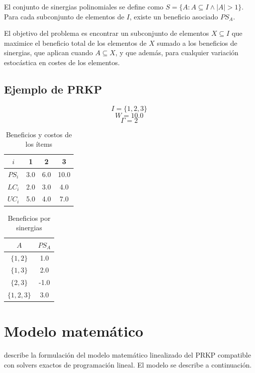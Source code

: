 \documentclass[spanish, a4paper, 12pt, openany,final]{book}
\begin{document}
	El conjunto de sinergias polinomiales se define como $S = \{ A: A \subseteq I \land |A|>1  \}$. Para cada subconjunto de elementos de $I$, existe un beneficio asociado $PS_A$.
	
	El objetivo del problema es encontrar un subconjunto de elementos $X \subseteq I$ que maximice el beneficio total de los elementos de $X$ sumado a los beneficios de sinergias, que aplican cuando $A\subseteq X$, y que además, para cualquier variación estocástica en costes de los elementos.
	
	\subsection*{Ejemplo de PRKP}
		$$I =\{1,2,3\}$$
		$$W = 10.0$$
		$$\Gamma = 2$$

	\begin{table}[H]
		\centering
	\begin{tabular}{|c|c|c|c|}
		\hline
		$i$ & 1 & 2 & 3 \\
		\hline
		$PS_i$ & 3.0 & 6.0 & 10.0 \\
		\hline
		$LC_i$ & 2.0 & 3.0 & 4.0 \\
		\hline
		$UC_i$ & 5.0 & 4.0 & 7.0 \\
		\hline
	\end{tabular}
	\caption{Beneficios y costos de los ítems}
	\end{table}
	
	\begin{table}[H]
		\centering
		\begin{tabular}{|c|c|}
			\hline
			$A$    & $PS_A$\\
			\hline
			$\{1,2\}$ & 1.0 \\
			\hline
			$\{1,3\}$ & 2.0 \\
			\hline
			$\{2,3\}$ & -1.0\\
			\hline
			$\{1,2,3\}$ & 3.0\\
			\hline
		\end{tabular}
		\caption{Beneficios por sinergias}
	\end{table}
	
	
	
	
    
    \section{Modelo matemático}
    
    
    \cite{baldo_polynomial_2023} describe la formulación del modelo matemático linealizado del PRKP compatible con solvers exactos de programación lineal. El modelo se describe a continuación.
    
\end{document}
